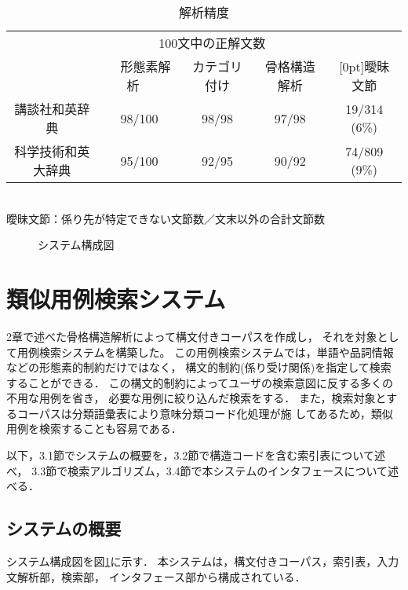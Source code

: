\begin{table}[htb]
\begin{center}
\caption{解析精度}
\label{ana-answer}
\begin{tabular}{|c||c|c|c||c|} \hline
 & \multicolumn{3}{c||}{100文中の正解文数} &  \\ \cline{2-4}
 & \ \ {\small 形態素解析}\ \  & {\small カテゴリ付け} & 
	{\small 骨格構造解析} & {\raisebox{1.5ex}[0pt]{曖昧文節}} \\ \hline \hline
講談社和英辞典     & 98/100 & 98/98  &  97/98  &  19/314 (6\%)   \\ \hline
科学技術和英大辞典 & 95/100 & 92/95  &  90/92  &  74/809 (9\%)  \\ \hline
\end{tabular} \\

\vspace{2mm}
{\small 曖昧文節：係り先が特定できない文節数／文末以外の合計文節数}
\vspace{-5mm}
\end{center}
\end{table}

\begin{figure}[b]
\begin{center}
  
\caption{システム構成図}
\label{system}
\end{center}
\end{figure}


\section{類似用例検索システム}
2章で述べた骨格構造解析によって構文付きコーパスを作成し，
それを対象として用例検索システムを構築した。
この用例検索システムでは，単語や品詞情報などの形態素的制約だけではなく，
構文的制約(係り受け関係)を指定して検索することができる．
この構文的制約によってユーザの検索意図に反する多くの不用な用例を省き，
必要な用例に絞り込んだ検索をする．
また，検索対象とするコーパスは分類語彙表により意味分類コード化処理が施
してあるため，類似用例を検索することも容易である．

以下，3.1節でシステムの概要を，3.2節で構造コードを含む索引表について述べ，
3.3節で検索アルゴリズム，3.4節で本システムのインタフェースについて述べる．

\subsection{システムの概要}
システム構成図を図\ref{system}に示す．
本システムは，構文付きコーパス，索引表，入力文解析部，検索部，
インタフェース部から構成されている．

